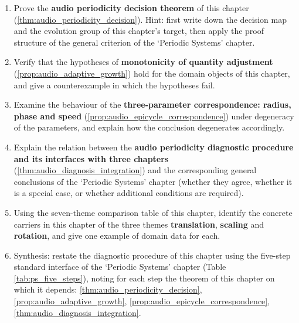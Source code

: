 \begin{enumerate}[leftmargin=3em, label=\textbf{Exercise \arabic*}]
    \item Prove the \textbf{audio periodicity decision theorem} of this chapter (\ref{thm:audio_periodicity_decision}). Hint: first write down the decision map and the evolution group of this chapter's target, then apply the proof structure of the general criterion of the `Periodic Systems' chapter.

    \item Verify that the hypotheses of \textbf{monotonicity of quantity adjustment} (\ref{prop:audio_adaptive_growth}) hold for the domain objects of this chapter, and give a counterexample in which the hypotheses fail.

    \item Examine the behaviour of the \textbf{three-parameter correspondence: radius, phase and speed} (\ref{prop:audio_epicycle_correspondence}) under degeneracy of the parameters, and explain how the conclusion degenerates accordingly.

    \item Explain the relation between the \textbf{audio periodicity diagnostic procedure and its interfaces with three chapters} (\ref{thm:audio_diagnosis_integration}) and the corresponding general conclusions of the `Periodic Systems' chapter (whether they agree, whether it is a special case, or whether additional conditions are required).

    \item Using the seven-theme comparison table of this chapter, identify the concrete carriers in this chapter of the three themes \textbf{translation}, \textbf{scaling} and \textbf{rotation}, and give one example of domain data for each.

    \item Synthesis: restate the diagnostic procedure of this chapter using the five-step standard interface of the `Periodic Systems' chapter (Table \ref{tab:ps_five_steps}), noting for each step the theorem of this chapter on which it depends: \ref{thm:audio_periodicity_decision}, \ref{prop:audio_adaptive_growth}, \ref{prop:audio_epicycle_correspondence}, \ref{thm:audio_diagnosis_integration}.
\end{enumerate}


